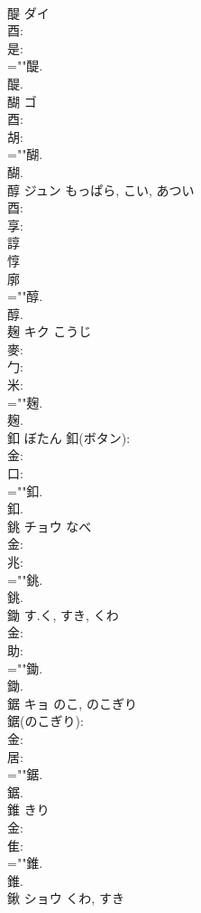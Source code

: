 \documentclass[8pt]{extreport}
\begin{document}
\begin{CJK}{UTF8}{min}
\\	醍	ダイ			
\\	酉: 
\\	是: 
\\	=""醍.
\\	醍.
\\	醐	ゴ			
\\	酉: 
\\	胡: 
\\	=""醐.
\\	醐.
\\	醇	ジュン	もっぱら, こい, あつい		
\\	酉: 
\\	享: 
\\	諄 
\\	惇 
\\	廓 
\\	=""醇.
\\	醇.
\\	麹	キク	こうじ		
\\	麥: 
\\	勹: 
\\	米: 
\\	=""麹.
\\	麹.
\\	釦		ぼたん			釦(ボタン): 
\\	金: 
\\	口: 
\\	=""釦.
\\	釦.
\\	銚	チョウ	なべ		
\\	金: 
\\	兆: 
\\	=""銚.
\\	銚.
\\	鋤		す.く, すき, くわ				
\\	金: 
\\	助: 
\\	=""鋤.
\\	鋤.
\\	鋸	キョ	のこ, のこぎり		
\\	鋸(のこぎり): 
\\	金: 
\\	居: 
\\	=""鋸.
\\	鋸.
\\	錐		きり				
\\	金: 
\\	隹: 
\\	=""錐.
\\	錐.
\\	鍬	ショウ	くわ, すき		

\end{CJK}
\end{document}

